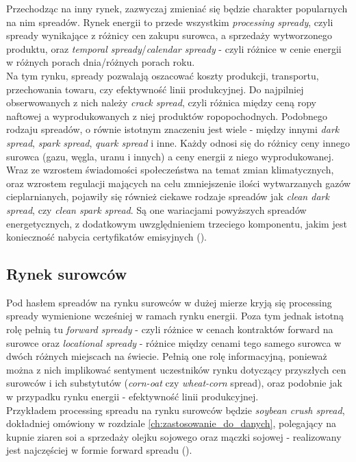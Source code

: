 Przechodząc na inny rynek, zazwyczaj zmieniać się będzie charakter popularnych na nim spreadów. Rynek energii to przede wszystkim \emph{processing spready}, czyli spready wynikające z różnicy cen zakupu surowca, a sprzedaży wytworzonego produktu, oraz \emph{temporal spready}/\emph{calendar spready} - czyli różnice w cenie energii w różnych porach dnia/różnych porach roku.\\
Na tym rynku, spready pozwalają oszacować koszty produkcji, transportu, przechowania towaru, czy efektywność linii produkcyjnej. Do najpilniej obserwowanych z nich należy \emph{crack spread}, czyli różnica między ceną ropy naftowej a wyprodukowanych z niej produktów ropopochodnych. Podobnego rodzaju spreadów, o równie istotnym znaczeniu jest wiele - między innymi \emph{dark spread}, \emph{spark spread}, \emph{quark spread} i inne. Każdy odnosi się do różnicy ceny innego surowca (gazu, węgla, uranu i innych) a ceny energii z niego wyprodukowanej.\\
Wraz ze wzrostem świadomości społeczeństwa na temat zmian klimatycznych, oraz wzrostem regulacji mających na celu zmniejszenie ilości wytwarzanych gazów cieplarnianych, pojawiły się również ciekawe rodzaje spreadów jak \emph{clean dark spread}, czy \emph{clean spark spread}. Są one wariacjami powyższych spreadów energetycznych, z dodatkowym uwzględnieniem trzeciego komponentu, jakim jest konieczność nabycia certyfikatów emisyjnych (\cite{Carmona_Clean_Spreads}).

\subsection{Rynek surowców}

Pod hasłem spreadów na rynku surowców w dużej mierze kryją się processing spready wymienione wcześniej w ramach rynku energii. Poza tym jednak istotną rolę pełnią tu \emph{forward spready} - czyli różnice w cenach kontraktów forward na surowce oraz \emph{locational spready} - różnice między cenami tego samego surowca w dwóch różnych miejscach na świecie. Pełnią one rolę informacyjną, ponieważ można z nich implikować sentyment uczestników rynku dotyczący przyszłych cen surowców i ich substytutów (\emph{corn-oat} czy \emph{wheat-corn} spread), oraz podobnie jak w przypadku rynku energii - efektywność linii produkcyjnej.\\
Przykładem processing spreadu na rynku surowców będzie \emph{soybean crush spread}, dokładniej omówiony w rozdziale \ref{ch:zastosowanie_do_danych}, polegający na kupnie ziaren soi a sprzedaży olejku sojowego oraz mączki sojowej - realizowany jest najczęściej w formie forward spreadu (\cite{Agro_Spreads}).
